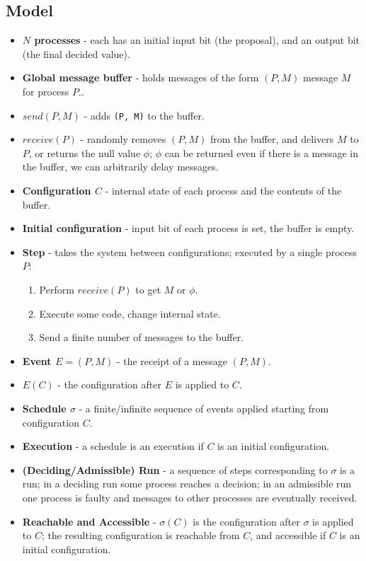 \documentclass[11pt]{article}
\begin{document}
\subsection{Model}
\begin{itemize}
  \item \textbf{$N$ processes} - each has an initial input bit (the proposal), and an output bit (the final decided value).
  \item \textbf{Global message buffer} - holds messages of the form $(P, M)$ message $M$ for process $P$..
  \item $send(P, M)$ - adds \texttt{(P, M)} to the buffer.
  \item $receive(P)$ - randomly removes $(P, M)$ from the buffer, and delivers $M$ to $P$, or returns the null value $\phi$; $\phi$ can be returned even if there is a message in the buffer, we can arbitrarily delay messages.
  \item \textbf{Configuration $C$} - internal state of each process and the contents of the buffer.
  \item \textbf{Initial configuration} - input bit of each process is set, the buffer is empty.
  \item \textbf{Step} - takes the system between configurations; executed by a single process $P$:
    \begin{enumerate}
      \item Perform $receive(P)$ to get $M$ or $\phi$.
      \item Execute some code, change internal state.
      \item Send a finite number of messages to the buffer.
    \end{enumerate}
  \item \textbf{Event $E=(P, M)$} - the receipt of a message $(P, M)$.
  \item \textbf{$E(C)$} - the configuration after $E$ is applied to $C$.
  \item \textbf{Schedule $\sigma$} - a finite/infinite sequence of events applied starting from configuration $C$.
  \item \textbf{Execution} - a schedule is an execution if $C$ is an initial configuration.
  \item \textbf{(Deciding/Admissible) Run} - a sequence of steps corresponding to $\sigma$ is a run; in a deciding run some process reaches a decision; in an admissible run one process is faulty and messages to other processes are eventually received.
  \item \textbf{Reachable and Accessible} - $\sigma(C)$ is the configuration after $\sigma$ is applied to $C$; the resulting configuration is reachable from $C$, and accessible if $C$ is an initial configuration.
\end{itemize}
\end{document}
